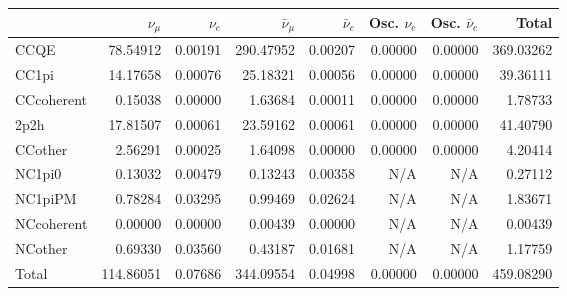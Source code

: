 \begin{tabular} { | l ||r | r | r | r | r | r | | r | }
\hline
              & $\nu_\mu$            & $\nu_e$              & $\bar{\nu}_{\mu}$    & $\bar{\nu}_{e}$      & Osc. $\nu_e$         & Osc. $\bar{\nu}_{e}$ & Total                \\ \hline\hline
 CCQE         & 78.54912             & 0.00191              & 290.47952            & 0.00207              & 0.00000              & 0.00000              & 369.03262            \\ \hline
 CC1pi        & 14.17658             & 0.00076              & 25.18321             & 0.00056              & 0.00000              & 0.00000              & 39.36111             \\ \hline
 CCcoherent   & 0.15038              & 0.00000              & 1.63684              & 0.00011              & 0.00000              & 0.00000              & 1.78733              \\ \hline
 2p2h         & 17.81507             & 0.00061              & 23.59162             & 0.00061              & 0.00000              & 0.00000              & 41.40790             \\ \hline
 CCother      & 2.56291              & 0.00025              & 1.64098              & 0.00000              & 0.00000              & 0.00000              & 4.20414              \\ \hline
 NC1pi0       & 0.13032              & 0.00479              & 0.13243              & 0.00358              & N/A                  & N/A                  & 0.27112              \\ \hline
 NC1piPM      & 0.78284              & 0.03295              & 0.99469              & 0.02624              & N/A                  & N/A                  & 1.83671              \\ \hline
 NCcoherent   & 0.00000              & 0.00000              & 0.00439              & 0.00000              & N/A                  & N/A                  & 0.00439              \\ \hline
 NCother      & 0.69330              & 0.03560              & 0.43187              & 0.01681              & N/A                  & N/A                  & 1.17759              \\ \hline
\hline
 Total        & 114.86051            & 0.07686              & 344.09554            & 0.04998              & 0.00000              & 0.00000              & 459.08290            \\ \hline

\end{tabular}
